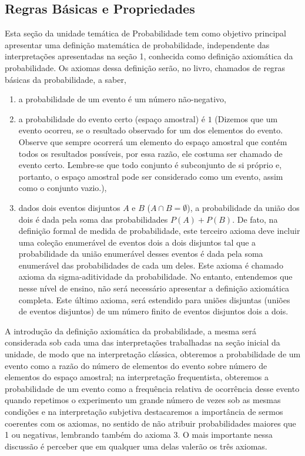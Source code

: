 \clearpage
\def\currentcolor{session1}
\begin{paginatexto}
{\section{Regras Básicas e Propriedades}

Esta seção da unidade temática de Probabilidade tem como objetivo principal apresentar uma definição matemática de probabilidade, independente das interpretações apresentadas na seção 1, conhecida como definição axiomática da probabilidade. Os axiomas dessa definição serão, no livro, chamados de regras básicas da probabilidade, a saber,

\begin{enumerate}
\item a probabilidade de um evento é um número não-negativo,

\item a probabilidade do evento certo (espaço amostral) é $1$ (Dizemos que um evento ocorreu, se o resultado observado for um dos elementos do evento. Observe que sempre ocorrerá um elemento do espaço amostral que contém todos os resultados possíveis, por essa razão, ele costuma ser chamado de evento certo. Lembre-se que todo conjunto é subconjunto de si próprio e, portanto, o espaço amostral pode ser considerado como um evento, assim como o conjunto vazio.),

\item dados dois eventos disjuntos $A$ e $B$ ($A\cap B=\emptyset$), a probabilidade da união dos dois é dada pela soma das probabilidades $P(A)+P(B)$. De fato, na definição formal de medida de probabilidade, este terceiro axioma deve incluir uma coleção enumerável de eventos dois a dois disjuntos tal que a probabilidade da união enumerável desses eventos é dada pela soma enumerável das probabilidades de cada um deles. Este axioma é chamado axioma da sigma-aditividade da probabilidade. No entanto, entendemos que nesse nível de ensino, não será necessário apresentar a definição axiomática completa. Este último axioma, será estendido para uniões disjuntas (uniões de eventos disjuntos) de um número finito de eventos disjuntos dois a dois.
\end{enumerate}

A introdução da definição axiomática da probabilidade, a mesma será considerada sob cada uma das interpretações trabalhadas na seção inicial da unidade, de modo que na interpretação clássica, obteremos a probabilidade de um evento como a razão do número de elementos do evento sobre número de elementos do espaço amostral; na interpretação frequentista, obteremos a probabilidade de um evento como a frequência relativa de ocorrência desse evento quando repetimos o experimento um grande número de vezes sob as mesmas condições e na interpretação subjetiva destacaremos a importância de sermos coerentes com os axiomas, no sentido de não atribuir probabilidades maiores que 1 ou negativas, lembrando também do axioma 3. O mais importante nessa discussão é perceber que em qualquer uma delas valerão os três axiomas.

}
\end{paginatexto}
